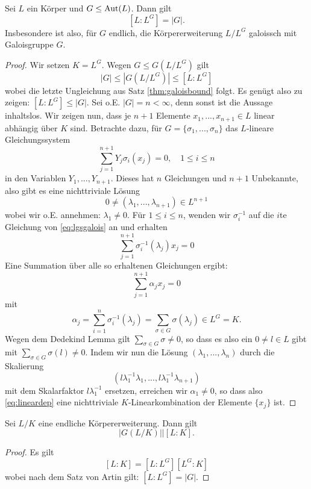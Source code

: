 \documentclass{book}
\begin{document}
\begin{thm}[Artin]
    \label{thm:artin} Sei $L$ ein Körper und $G \le \operatorname{Aut}(L)$. Dann gilt
    \[
        [L:L^G] = |G|.
    \]
    Insbesondere ist also, für $G$ endlich, die Körpererweiterung $L/L^G$
    galoissch mit Galoisgruppe $G$.  
\end{thm}
\begin{proof}
    Wir setzen $K = L^G$. Wegen $G \le G(L/L^G)$ gilt
    \[
        |G| \le |G(L/L^G)| \le [L:L^G]
    \]
    wobei die letzte Ungleichung aus Satz \ref{thm:galoisbound} folgt. Es
    genügt also zu zeigen: $[L:L^G] \le |G|$. Sei o.E. $|G| = n < \infty$, denn
    sonst ist die Aussage inhaltslos. Wir zeigen nun, dass je $n+1$ Elemente
    $x_1, ..., x_{n+1} \in L$ linear abhängig über $K$ sind. Betrachte dazu,
    für $G = \{\sigma_1, ..., \sigma_n\}$ das $L$-lineare Gleichungssystem
    \begin{equation}
        \label{eq:lgsgalois}
        \sum_{j=1}^{n+1} Y_j \sigma_i(x_j) = 0, \quad 1 \le i \le n
    \end{equation}
    in den Variablen $Y_1, ..., Y_{n+1}$. Dieses hat $n$ Gleichungen und $n+1$ Unbekannte, also gibt es eine nichttriviale Lösung
    \[
        0 \ne (\lambda_1, ..., \lambda_{n+1}) \in L^{n+1}
    \]
    wobei wir o.E. annehmen: $\lambda_1 \ne 0$. Für $1 \le i \le n$, wenden wir
    $\sigma_i^{-1}$ auf die $i$te Gleichung von \eqref{eq:lgsgalois} an und
    erhalten
    \[
        \sum_{j=1}^{n+1} \sigma_i^{-1}(\lambda_j) x_j = 0
    \]
    Eine Summation über alle so erhaltenen Gleichungen ergibt:
    \begin{equation}
        \label{eq:lineardep}
        \sum_{j=1}^{n+1} \alpha_j x_j = 0
    \end{equation}
    mit 
    \[
        \alpha_j = \sum_{i=1}^{n} \sigma_i^{-1}(\lambda_j) = \sum_{\sigma \in G} \sigma(\lambda_j) \in L^G = K.
    \]
    Wegen dem Dedekind Lemma gilt $\sum_{\sigma \in G} \sigma \ne 0$, so dass
    es also ein $0 \ne l \in L$ gibt mit $\sum_{\sigma \in G}\sigma(l) \ne 0$.
    Indem wir nun die Lösung $(\lambda_1, ..., \lambda_n)$ durch die Skalierung 
    \[
        (l\lambda_1^{-1} \lambda_1, ..., l\lambda_1^{-1} \lambda_{n+1})
    \]
    mit dem Skalarfaktor $l\lambda_1^{-1}$ ersetzen, erreichen wir $\alpha_1
    \ne 0$, so dass also \eqref{eq:lineardep} eine nichttriviale
    $K$-Linearkombination der Elemente $\{x_j\}$ ist. 
\end{proof}

\begin{cor}
    \label{cor:galdivides}
    Sei $L/K$ eine endliche Körpererweiterung. Dann gilt
    \[
        |G(L/K)| | [L:K].
    \]
\end{cor}
\begin{proof}
    Es gilt
    \[
        [L:K] = [L : L^G] [L^G:K]
    \]
    wobei nach dem Satz von Artin gilt: $[L:L^G] = |G|$. 
\end{proof}
\end{document}
